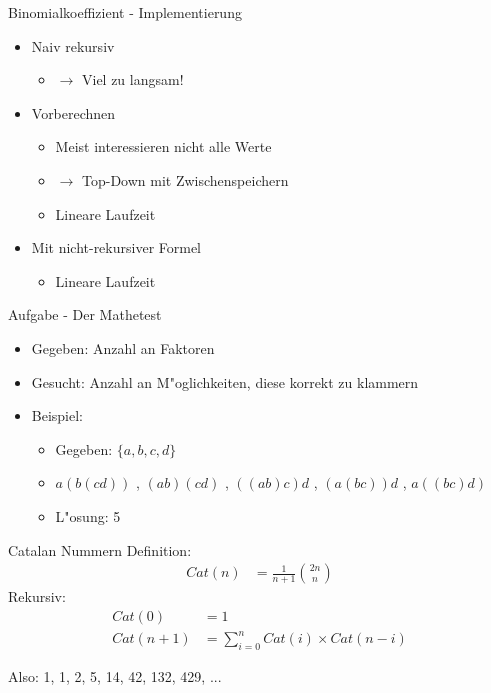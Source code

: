 \documentclass[18pt]{beamer}
\begin{document}
\begin{frame}{Binomialkoeffizient - Implementierung}
\begin{itemize}
\item Naiv rekursiv
\begin{itemize}
\item $\rightarrow$ Viel zu langsam!
\end{itemize}
\item Vorberechnen
\begin{itemize}
\item Meist interessieren nicht alle Werte
\item $\rightarrow$ Top-Down mit Zwischenspeichern
\item Lineare Laufzeit
\end{itemize}
\item Mit nicht-rekursiver Formel
\begin{itemize}
\item Lineare Laufzeit
\end{itemize}
\end{itemize}
\end{frame}



\begin{frame}{Aufgabe - Der Mathetest}
\begin{itemize}
\item Gegeben: Anzahl an Faktoren
\item Gesucht: Anzahl an M"oglichkeiten, diese korrekt zu klammern
\item Beispiel:
\begin{itemize}
\item Gegeben: $\lbrace a, b, c, d \rbrace$
\item $ a \left( b \left( c d \right) \right) $ , $\left( a b \right) \left( c d \right) $ , $\left( \left( a b \right) c \right) d$ , $\left( a \left( b  c \right) \right) d $ , $ a \left( \left( b  c \right) d \right) $
\item L"osung: 5
\end{itemize}
\end{itemize}
\end{frame}

\begin{frame}{Catalan Nummern}
Definition:
\begin{align*}
Cat \left( n \right) &= \frac{1}{n+1} \binom{2n}{n} 
\end{align*}
Rekursiv:
\begin{align*}
Cat \left( 0 \right) &= 1 \\
Cat \left( n + 1 \right) &= \sum_{i=0}^n Cat \left( i \right) \times Cat \left( n - i \right)
\end{align*}

Also: 1, 1, 2, 5, 14, 42, 132, 429, ...
\end{frame}
\end{document}
